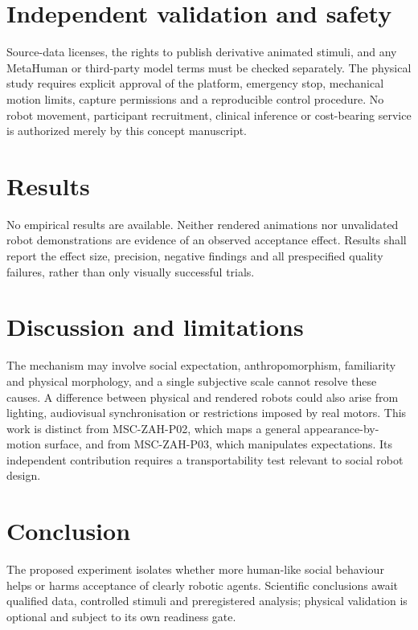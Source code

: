 \documentclass[11pt,a4paper]{article}
\begin{document}
\section{Independent validation and safety}
Source-data licenses, the rights to publish derivative animated stimuli, and any MetaHuman or third-party model terms must be checked separately. The physical study requires explicit approval of the platform, emergency stop, mechanical motion limits, capture permissions and a reproducible control procedure. No robot movement, participant recruitment, clinical inference or cost-bearing service is authorized merely by this concept manuscript.

\section{Results}
No empirical results are available. Neither rendered animations nor unvalidated robot demonstrations are evidence of an observed acceptance effect. Results shall report the effect size, precision, negative findings and all prespecified quality failures, rather than only visually successful trials.

\section{Discussion and limitations}
The mechanism may involve social expectation, anthropomorphism, familiarity and physical morphology, and a single subjective scale cannot resolve these causes. A difference between physical and rendered robots could also arise from lighting, audiovisual synchronisation or restrictions imposed by real motors. This work is distinct from MSC-ZAH-P02, which maps a general appearance-by-motion surface, and from MSC-ZAH-P03, which manipulates expectations. Its independent contribution requires a transportability test relevant to social robot design.

\section{Conclusion}
The proposed experiment isolates whether more human-like social behaviour helps or harms acceptance of clearly robotic agents. Scientific conclusions await qualified data, controlled stimuli and preregistered analysis; physical validation is optional and subject to its own readiness gate.
\end{document}
